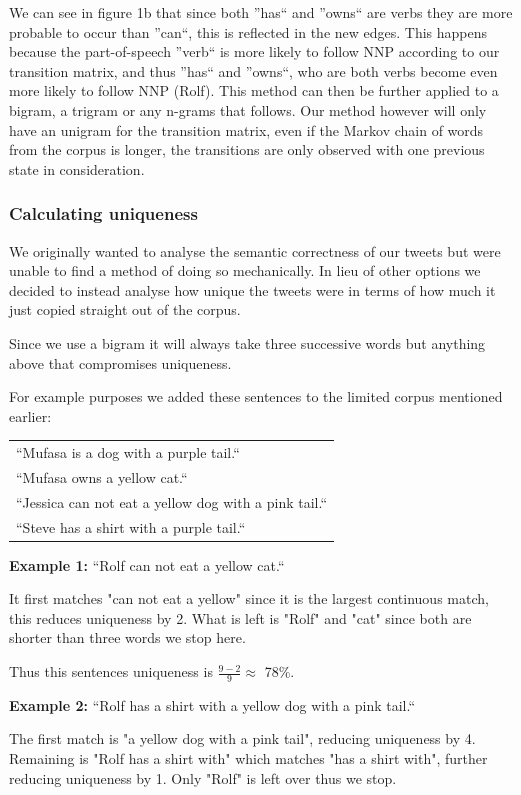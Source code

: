\documentclass[a4paper,12pt]{article}
\begin{document}
We can see in figure 1b that since both ''has`` and ''owns`` are verbs they are more probable to occur than ''can``, this is reflected in the new edges. 
This happens because the part-of-speech ''verb`` is more likely to follow NNP according to our transition matrix, and thus ''has`` and ''owns``, who are 
both verbs become even more likely to follow NNP (Rolf). This method can then be further applied to a bigram, a trigram or any n-grams that follows. 
Our method however will only have an unigram for the transition matrix, even if the Markov chain of words from the corpus is longer, 
the transitions are only observed with one previous state in consideration.

\subsubsection{Calculating uniqueness}
We originally wanted to analyse the semantic correctness of our tweets but were unable to find a method of doing so mechanically. In lieu of other options we decided to instead analyse how unique the tweets were in terms of how much it just copied straight out of the corpus.

Since we use a bigram it will always take three successive words but anything above that compromises uniqueness.

For example purposes we added these sentences to the limited corpus mentioned earlier:

\begin{tabular}{l}
``Mufasa is a dog with a purple tail.``\\
``Mufasa owns a yellow cat.``\\
``Jessica can not eat a yellow dog with a pink tail.``\\
``Steve has a shirt with a purple tail.``\\
\end{tabular}

\textbf{Example 1:} ``Rolf can not eat a yellow cat.``
	
It first matches "can not eat a yellow" since it is the largest continuous match, this reduces uniqueness by 2. What is left is "Rolf" and "cat" since both are shorter than three words we stop here.

Thus this sentences uniqueness is $\frac{9 - 2}{9} \approx$ 78\%.

\textbf{Example 2:} ``Rolf has a shirt with a yellow dog with a pink tail.``
	
The first match is "a yellow dog with a pink tail", reducing uniqueness by 4. Remaining is "Rolf has a shirt with" which matches "has a shirt with", further reducing uniqueness by 1. Only "Rolf" is left over thus we stop. 
\end{document}
